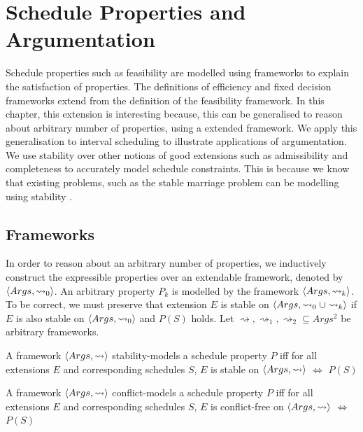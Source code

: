 \chapter{Schedule Properties and Argumentation}
\label{properties}

Schedule properties such as feasibility are modelled using frameworks to explain the satisfaction of properties. The definitions of efficiency and fixed decision frameworks extend from the definition of the feasibility framework. In this chapter, this extension is interesting because, this can be generalised to reason about arbitrary number of properties, using a extended framework. We apply this generalisation to interval scheduling to illustrate applications of argumentation.
\linespace 
We use stability over other notions of good extensions such as admissibility and completeness to accurately model schedule constraints. This is because we know that existing problems, such as the stable marriage problem can be modelling using stability \cite{aa}.

\section{Frameworks}
\label{unionframeworks}

In order to reason about an arbitrary number of properties, we inductively construct the expressible properties over an extendable framework, denoted by $\langle{Args},{\rightsquigarrow_0}\rangle$. An arbitrary property $P_k$ is modelled by the framework $\langle{Args},{\rightsquigarrow_k}\rangle$. To be correct, we must preserve that extension $E$ is stable on $\langle{Args},{\rightsquigarrow_0\cup\rightsquigarrow_k}\rangle$ if $E$ is also stable on $\langle{Args},{\rightsquigarrow_0}\rangle$ and $P(S)$ holds. Let $\rightsquigarrow,\rightsquigarrow_1,\rightsquigarrow_2\subseteq Args^2$ be arbitrary frameworks.

\begin{definition}
	A framework $\langle{Args},{\rightsquigarrow}\rangle$ stability-models a schedule property $P$ iff for all extensions $E$ and corresponding schedules $S$, $E$ is stable on $\langle{Args},{\rightsquigarrow}\rangle$ $\Leftrightarrow$ $P(S)$
\end{definition}

\begin{definition}
	A framework $\langle{Args},{\rightsquigarrow}\rangle$ conflict-models a schedule property $P$ iff for all extensions $E$ and corresponding schedules $S$, $E$ is conflict-free on $\langle{Args},{\rightsquigarrow}\rangle$ $\Leftrightarrow$ $P(S)$
\end{definition}

